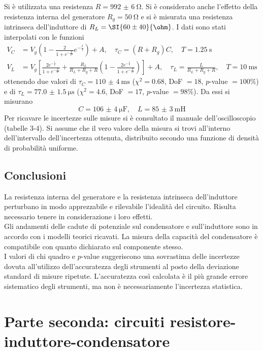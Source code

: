 \documentclass[a4paper]{article}
\begin{document}
Si è utilizzata una resistenza $R=\SI{992(6)}{\ohm}$. Si è considerato anche l'effetto della resistenza interna del generatore $R_g=\SI{50}{\ohm}$ e si è misurata una resistenza intrinseca dell'induttore di $R_L=\SI{60 \pm 40}{\ohm}$.
I dati sono stati interpolati con le funzioni
\begin{align*}
	V_C&=V_g \left( 1- \frac{2}{1+e^{-\frac{T}{2\tau}}}e^{-\frac{t}{\tau}} \right) +A,\quad \tau_C=(R+R_g)C,\quad T=\SI{1.25}{\s}\\
	V_L&=V_g \left[ \frac{2e^{-\frac{t}{\tau}}}{1+e^{-\frac{T}{2\tau}}}+\frac{R_L}{R_L+R_g+R}\left( 1-\frac{2e^{-\frac{t}{\tau}}}{1+e^{-\frac{T}{2\tau}}} \right)  \right]+A,\quad \tau_L=\frac{L}{R_L+R_g+R},\quad T=\SI{10}{\ms}
\end{align*}
ottenendo due valori di $\tau_C=\SI{110(4)}{\milli\s}$ ($\chi^2=0.68$, DoF $=18$, $p$-value $=100\%$) e di $\tau_L=\SI{77.0(15)}{\micro\s}$ ($\chi^2=4.6$, DoF $=17$, $p$-value $=98\%$). Da essi si misurano
\[
C=\SI{106(4)}{\micro\F},\quad L=\SI{85(3)}{\milli\henry}
\]
Per ricavare le incertezze sulle misure si è consultato il manuale dell'oscilloscopio (tabelle 3-4). Si assume che il vero valore della misura si trovi all'interno dell'intervallo dell'incertezza ottenuta, distribuito secondo una funzione di densità di probabilità uniforme.

\subsection{Conclusioni}
La resistenza interna del generatore e la resistenza intrinseca dell'induttore perturbano in modo apprezzabile e rilevabile l'idealità del circuito. Risulta necessario tenere in considerazione i loro effetti.\\
Gli andamenti delle cadute di potenziale sul condensatore e sull'induttore sono in accordo con i modelli teorici ricavati. La misura della capacità del condensatore è compatibile con quanto dichiarato sul componente stesso.\\
I valori di chi quadro e $p$-value suggeriscono una sovrastima delle incertezze dovuta all'utilizzo dell'accuratezza degli strumenti al posto della deviazione standard di misure ripetute. L'accuratezza così calcolata è il più grande errore sistematico degli strumenti, ma non è necessariamente l'incertezza statistica.
\clearpage

\section{Parte seconda: circuiti resistore-induttore-condensatore}
\end{document}
